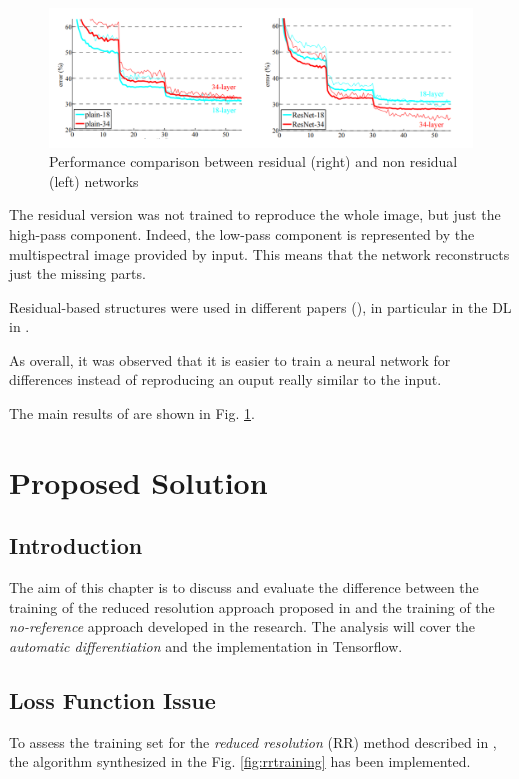 \documentclass[12pt]{report}
\begin{document}
\begin{figure}[t]
    \centering
    \includegraphics[scale=.35]{residual_comparison.png}
    \caption{Performance comparison between residual (right) and non residual (left) networks \cite{residual4}}
    \label{fig:residual-comparison}
\end{figure}

The residual version was not trained to reproduce the whole image,
but just the high-pass component. Indeed, the low-pass component is represented by the 
multispectral image provided by input. This means that the network reconstructs just the missing parts.

Residual-based structures were used in different papers (\cite{residual1, residual2}), in particular in the DL in \cite{residual3, residual4}.

As overall, it was observed that it is easier to train a neural network for differences
instead of reproducing an ouput really similar to the input. 


The main results of \cite{residual4} are shown in Fig. \ref{fig:residual-comparison}.

\newpage

\chapter{Proposed Solution}

\section{Introduction}

The aim of this chapter is to discuss and evaluate the difference between the training of the reduced resolution approach proposed in \cite{pnn}
and the training of the \textit{no-reference} approach developed in the research.
The analysis will cover the \textit{automatic differentiation} and the implementation in Tensorflow.

\section{Loss Function Issue}
\label{sec:lossfunction}
To assess the training set for the \textit{reduced resolution} (RR) method  described in \cite{pnn},
the algorithm synthesized in the Fig. \ref{fig:rrtraining} has been implemented.
\end{document}

